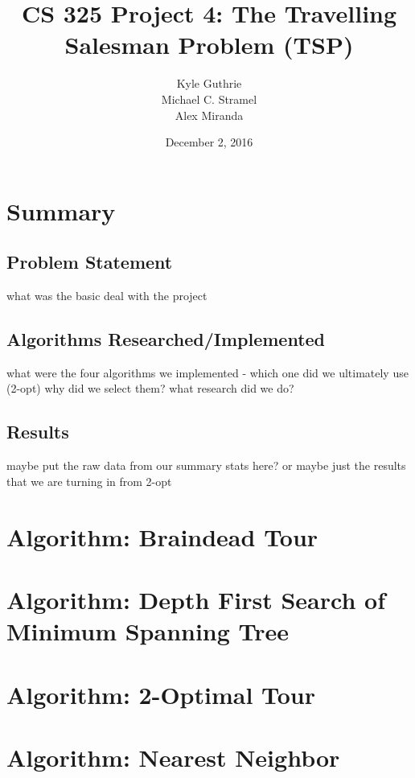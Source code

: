 \documentclass[12pt]{article}
\title{CS 325 Project 4: The Travelling Salesman Problem (TSP)}
\author{ Kyle Guthrie \\
         Michael C. Stramel \\
         Alex Miranda
}
\date{December 2, 2016}
\begin{document}
\maketitle

\newpage
\section*{Summary}
\subsection*{Problem Statement}

what was the basic deal with the project

\subsection*{Algorithms Researched/Implemented}

what were the four algorithms we implemented - which one did we ultimately use (2-opt)
why did we select them?
what research did we do?

\subsection*{Results}

maybe put the raw data from our summary stats here?  or maybe just the results that we are turning in from 2-opt

\newpage
\section*{Algorithm: Braindead Tour}


\newpage
\section*{Algorithm: Depth First Search of Minimum Spanning Tree}


\newpage
\section*{Algorithm: 2-Optimal Tour}


\newpage
\section*{Algorithm: Nearest Neighbor}


\newpage
\printbibliography
\end{document}
